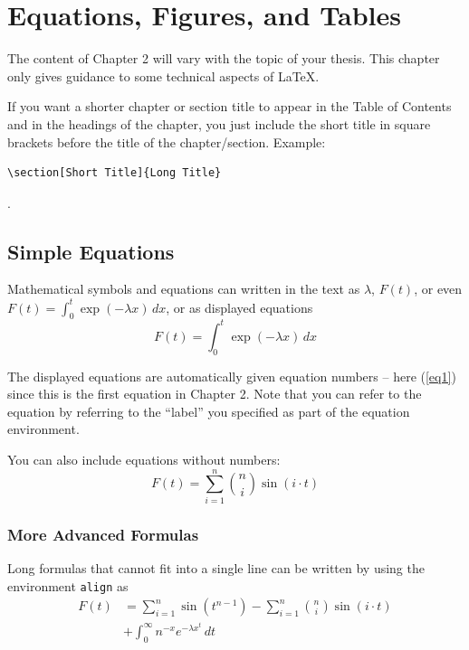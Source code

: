 \chapter[Equations, etc]{Equations, Figures, and Tables}
The content of Chapter 2 will vary with the topic of your thesis. This chapter only gives guidance to some technical aspects of \LaTeX.
 
\begin{remark}
If you want a shorter chapter or section title to appear in the Table of Contents and in the headings of the chapter, you just include the short title in square brackets before the title of the chapter/section. Example: \begin{verbatim}\section[Short Title]{Long Title}\end{verbatim}.
\end{remark}

\section{Simple Equations}
Mathematical symbols and equations can written in the text as $\lambda$, $F(t)$, or even $F(t)=\int_0^t \exp(-\lambda x)\,dx$, or as displayed equations
\begin{equation}
F(t)=\int_0^t \exp(-\lambda x)\,dx
\label{eq1}
\end{equation}


The displayed equations are automatically given equation numbers -- here (\ref{eq1}) since this is the first equation in Chapter 2. Note that you can refer to the equation by referring to the ``label'' you specified as part of the equation environment.

You can also include equations without numbers:
\begin{equation*}
F(t)=\sum_{i=1}^n \binom{n}{i}\sin(i\cdot t)
\end{equation*}

\subsection*{More Advanced Formulas}
Long formulas that cannot fit into a single line can be written by using the environment \texttt{align} as
\begin{align}
F(t)&= \sum_{i=1}^n \sin(t^{n-1}) - \sum_{i=1}^n \binom{n}{i}\sin(i\cdot t) \\
      & + \int_0^\infty n^{-x} e^{-\lambda x^t}\,dt
\end{align}

